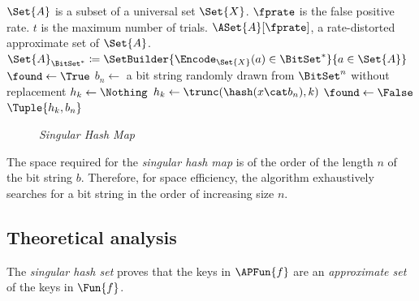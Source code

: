 \documentclass[ ../main.tex]{subfiles}
\begin{document}
\begin{algorithm}
	\caption{Implementation of \protect\MakeSingularHashMap over a universal set $\Set{X}$}
	\label{alg:makeset}
	\DontPrintSemicolon
	\KwIn
	{
		$\Set{A}$ is a subset of a universal set $\Set{X}$.
		$\fprate$ is the false positive rate.
		$t$ is the maximum number of trials.
	}
	\KwOut
	{
		$\ASet{A}[\fprate]$, a rate-distorted approximate set of $\Set{A}$.
	}
	{
		$\Set{A}_{\BitSet^*} \coloneqq \SetBuilder{\Encode_{\Set{X}}(a) \in \BitSet^*}{a \in \Set{A}}$\;
		{
			{
				$\found \gets \True$\;
				$b_n \gets $ a bit string randomly drawn from $\BitSet^n$ without replacement\;
				$h_k \gets \Nothing$\;
				{
					{
						$h_k \gets \trunc(\hash(x \cat b_n), k)$\;
					}
					{
						$\found \gets \False$\;
					}
				}
				\If{\found}
				{
					\Return $\Tuple{h_k, b_n}$\;
				}
			}
		}
	}
\end{algorithm}

\begin{figure}
    \centering
    \caption{\emph{Singular Hash Map}}
    \label{fig:shmap}
\end{figure}

The space required for the \emph{singular hash map} is of the order of the length $n$ of the bit string $b$. Therefore, for space efficiency, the algorithm exhaustively searches for a bit string in the order of increasing size $n$.

\subsection{Theoretical analysis}
The \emph{singular hash set} proves that the keys in $\APFun{f}$ are an \emph{approximate set} of the keys in $\Fun{f}$.
\end{document}
